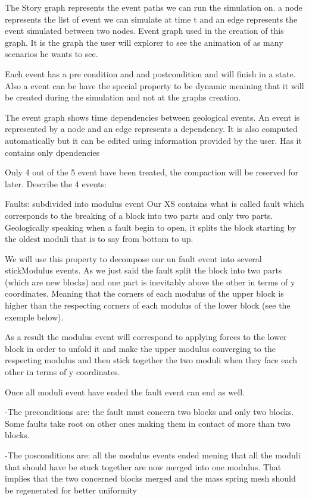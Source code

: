 \documentclass[12pt, a4paper]{memoir} %
\begin{document}
The Story graph represents the event paths we can run the simulation on. a node represents the list of event we can simulate at time t and an edge represents the event simulated between two nodes. Event graph used in the creation of this graph. It is the graph the user will explorer to see the animation of as many scenarios he wants to see.

Each event has a pre condition and and postcondition and will finish in a state.
Also a event can be have the special property to be dynamic meaining that it will be created during the simulation and not at 
the graphs creation.

The event graph shows time dependencies between geological events. An event is represented by a node and an edge represents a dependency. It is also computed automatically but it can be edited using information provided by the user. Has it contains only dpendencies

Only 4 out of the 5 event have been treated, the compaction will be reserved for later.
Describe the 4 events:


Faults: subdivided into modulus event
	Our XS contains what is called fault which corresponds to the breaking of a block into two parts and only two parts. Geologically speaking when a fault begin to open, it splits the block starting by the oldest moduli that is to say from bottom to up. 
	
	We will use this property to decompose our un fault event into several stickModulus events. As we just said the fault split the block into two parts (which are new blocks) and one part is inevitably above the other in terms of y coordinates. Meaning that the corners of each modulus of the upper block is higher than the respecting corners of each modulus of the lower block (see the exemple below). 
	
	As a result the modulus event will correspond to applying forces to the lower block in order to unfold it and make the upper modulus converging to the respecting modulus and then stick together the two moduli when they face each other in terms of y coordinates.
	
	Once all moduli event have ended the fault event can end as well.
	
	-The preconditions are: the fault must concern two blocks and only two blocks. Some faults take root on other ones making them in contact of more than two blocks. 
	
	-The posconditions are: all the modulus events ended mening that all the moduli that should have be stuck together are now merged into one modulus. That implies that the two concerned blocks merged and the mass spring mesh should be regenerated for better uniformity 
	
\end{document}
